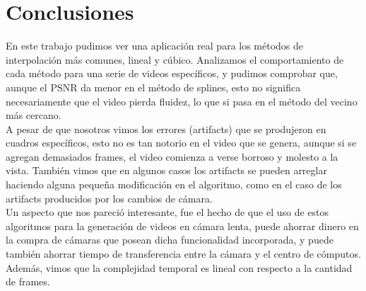 \section{Conclusiones}

En este trabajo pudimos ver una aplicación real para los métodos de interpolación más comunes, lineal y cúbico. Analizamos el comportamiento de cada método para una serie de videos específicos, y pudimos comprobar que, aunque el PSNR da menor en el método de splines, esto no significa necesariamente que el video pierda fluidez, lo que si pasa en el método del vecino más cercano.\\

A pesar de que nosotros vimos los errores (artifacts) que se produjeron en cuadros específicos, esto no es tan notorio en el video que se genera, aunque si se agregan demasiados frames, el video comienza a verse borroso y molesto a la vista. También vimos que en algunos casos los artifacts se pueden arreglar haciendo alguna pequeña modificación en el algoritmo, como en el caso de los artifacts producidos por los cambios de cámara.\\

Un aspecto que nos pareció interesante, fue el hecho de que el uso de estos algoritmos para la generación de videos en cámara lenta, puede ahorrar dinero en la compra de cámaras que posean dicha funcionalidad incorporada, y puede también ahorrar tiempo de transferencia entre la cámara y el centro de cómputos. Además, vimos que la complejidad temporal es lineal con respecto a la cantidad de frames.